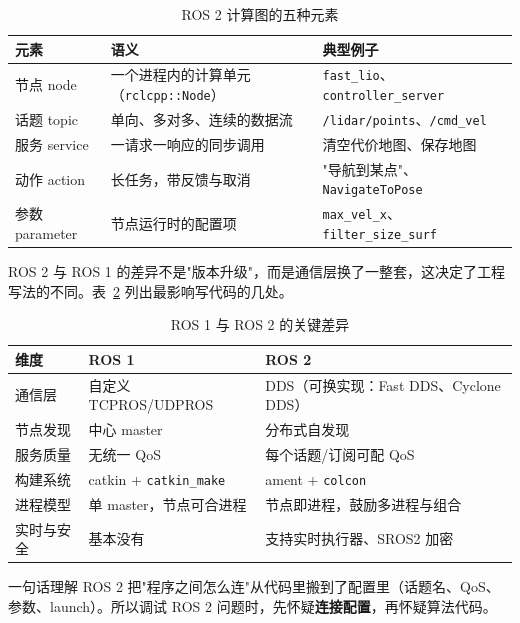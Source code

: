 \begin{table}[htbp]
  \centering
  \caption{ROS 2 计算图的五种元素}\label{tab:25-graph}
  \small
  \begin{tabular}{lp{5.2cm}p{5.2cm}}
    \toprule
    元素 & 语义 & 典型例子 \\
    \midrule
    节点 node & 一个进程内的计算单元（\lstinline{rclcpp::Node}） & \lstinline{fast_lio}、\lstinline{controller_server} \\
    话题 topic & 单向、多对多、连续的数据流 & \lstinline{/lidar/points}、\lstinline{/cmd_vel} \\
    服务 service & 一请求一响应的同步调用 & 清空代价地图、保存地图 \\
    动作 action & 长任务，带反馈与取消 & "导航到某点"、\lstinline{NavigateToPose} \\
    参数 parameter & 节点运行时的配置项 & \lstinline{max_vel_x}、\lstinline{filter_size_surf} \\
    \bottomrule
  \end{tabular}
\end{table}

ROS 2 与 ROS 1 的差异不是"版本升级"，而是通信层换了一整套，这决定了工程写法的不同。表~\ref{tab:25-vs1} 列出最影响写代码的几处。

\begin{table}[htbp]
  \centering
  \caption{ROS 1 与 ROS 2 的关键差异}\label{tab:25-vs1}
  \small
  \begin{tabular}{lll}
    \toprule
    维度 & ROS 1 & ROS 2 \\
    \midrule
    通信层 & 自定义 TCPROS/UDPROS & DDS（可换实现：Fast DDS、Cyclone DDS） \\
    节点发现 & 中心 master & 分布式自发现 \\
    服务质量 & 无统一 QoS & 每个话题/订阅可配 QoS \\
    构建系统 & catkin + \lstinline{catkin_make} & ament + \lstinline{colcon} \\
    进程模型 & 单 master，节点可合进程 & 节点即进程，鼓励多进程与组合 \\
    实时与安全 & 基本没有 & 支持实时执行器、SROS2 加密 \\
    \bottomrule
  \end{tabular}
\end{table}

\begin{keybox}{一句话理解}
ROS 2 把"程序之间怎么连"从代码里搬到了配置里（话题名、QoS、参数、launch）。所以调试 ROS 2 问题时，先怀疑\textbf{连接配置}，再怀疑算法代码。
\end{keybox}


